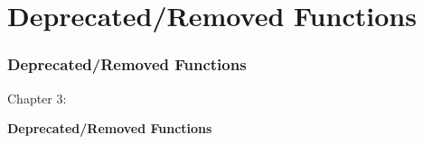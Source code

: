 %

\section{Deprecated/Removed Functions}
\begin{frame}[fragile]
	\frametitle{Deprecated/Removed Functions}

	\begin{center}\huge{Chapter 3:}\end{center}
	\begin{center}\huge{\color{typo3darkgrey}\textbf{Deprecated/Removed Functions}}\end{center}

\end{frame}

